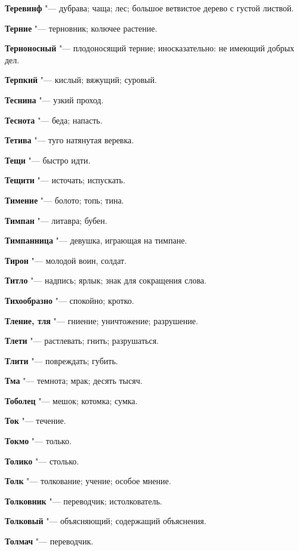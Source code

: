 \begin{mymulticols}
\noindent\textbf{Теревинф} "--- дубрава; чаща; лес; большое ветвистое дерево с густой листвой. 

\noindent\textbf{Терние} "--- терновник; колючее растение. 

\noindent\textbf{Терноносный} "--- плодоносящий терние; иносказательно: не имеющий добрых дел. 

\noindent\textbf{Терпкий} "--- кислый; вяжущий; суровый. 

\noindent\textbf{Теснина} "--- узкий проход. 

\noindent\textbf{Теснота} "--- беда; напасть. 

\noindent\textbf{Тетива} "--- туго натянутая веревка. 

\noindent\textbf{Тещи} "--- быстро идти. 

\noindent\textbf{Тещити} "--- источать; испускать. 

\noindent\textbf{Тимение} "--- болото; топь; тина. 

\noindent\textbf{Тимпан} "--- литавра; бубен. 

\noindent\textbf{Тимпанница} "--- девушка, играющая на тимпане. 

\noindent\textbf{Тирон} "--- молодой воин, солдат. 

\noindent\textbf{Титло} "--- надпись; ярлык; знак для сокращения слова. 

\noindent\textbf{Тихообразно} "--- спокойно; кротко. 

\noindent\textbf{Тление, тля} "--- гниение; уничтожение; разрушение. 

\noindent\textbf{Тлети} "--- растлевать; гнить; разрушаться. 

\noindent\textbf{Тлити} "--- повреждать; губить. 

\noindent\textbf{Тма} "--- темнота; мрак; десять тысяч. 

\noindent\textbf{Тоболец} "--- мешок; котомка; сумка. 

\noindent\textbf{Ток} "--- течение. 

\noindent\textbf{Токмо} "--- только. 

\noindent\textbf{Толико} "--- столько. 

\noindent\textbf{Толк} "--- толкование; учение; особое мнение. 

\noindent\textbf{Толковник} "--- переводчик; истолкователь. 

\noindent\textbf{Толковый} "--- объясняющий; содержащий объяснения. 

\noindent\textbf{Толмач} "--- переводчик. 


\end{mymulticols}
